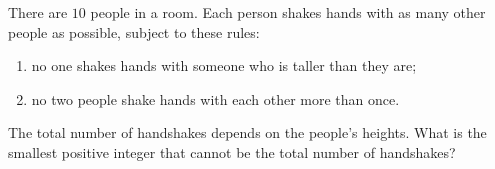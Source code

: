 There are $10$ people in a room. Each person shakes hands with as many other people as possible, subject to these rules:
\begin{enumerate}
\item no one shakes hands with someone who is taller than they are;
\item no two people shake hands with each other more than once.
\end{enumerate}
The total number of handshakes depends on the people's heights. What is the smallest positive integer that cannot be the total number of handshakes?
